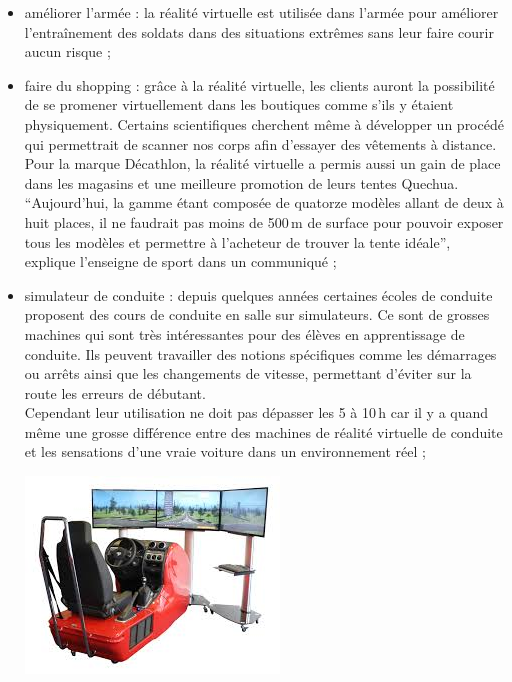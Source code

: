 \documentclass[12pt, a4paper]{report}
\begin{document}
\begin{itemize}
\item améliorer l'armée : la réalité virtuelle est utilisée dans l'armée pour améliorer l'entraînement des soldats dans des situations extrêmes sans leur faire courir aucun risque ;

\item faire du shopping : grâce à la réalité virtuelle, les clients auront la possibilité de se promener virtuellement dans les boutiques comme s'ils y étaient physiquement. Certains scientifiques cherchent même à développer un procédé qui permettrait de scanner nos corps afin d'essayer des vêtements à distance. Pour la marque Décathlon, la réalité virtuelle a permis aussi un gain de place dans les magasins et une meilleure promotion de leurs tentes Quechua. ``Aujourd'hui, la gamme étant composée de quatorze modèles allant de deux à huit places, il ne faudrait pas moins de 500\,m de surface pour pouvoir exposer tous les modèles et permettre à l'acheteur de trouver la tente idéale'', explique l'enseigne de sport dans un communiqué ;

\item simulateur de conduite : depuis quelques années certaines écoles de conduite proposent des cours de conduite en salle sur simulateurs. Ce sont de grosses machines qui sont très intéressantes pour des élèves en apprentissage de conduite. Ils peuvent travailler des notions spécifiques comme les démarrages ou arrêts ainsi que les changements de vitesse, permettant d'éviter sur la route les erreurs de débutant.\\
Cependant leur utilisation ne doit pas dépasser les 5 à 10\,h car il y a quand même une grosse différence entre des machines de réalité virtuelle de conduite et les sensations d'une vraie voiture dans un environnement réel ;

\begin{center}
\includegraphics[scale=0.75]{onduite.jpg}
\end{center}


\end{itemize}
\end{document}
